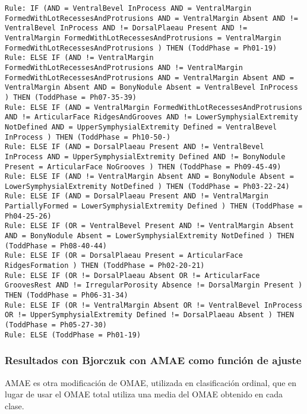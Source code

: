 \begin{lstlisting}
Rule: IF (AND = VentralBevel InProcess AND = VentralMargin FormedWithLotRecessesAndProtrusions AND = VentralMargin Absent AND != VentralBevel InProcess AND != DorsalPlaeau Present AND != VentralMargin FormedWithLotRecessesAndProtrusions = VentralMargin FormedWithLotRecessesAndProtrusions ) THEN (ToddPhase = Ph01-19)
Rule: ELSE IF (AND != VentralMargin FormedWithLotRecessesAndProtrusions AND != VentralMargin FormedWithLotRecessesAndProtrusions AND = VentralMargin Absent AND = VentralMargin Absent AND = BonyNodule Absent = VentralBevel InProcess ) THEN (ToddPhase = Ph07-35-39)
Rule: ELSE IF (AND = VentralMargin FormedWithLotRecessesAndProtrusions AND != ArticularFace RidgesAndGrooves AND != LowerSymphysialExtremity NotDefined AND = UpperSymphysialExtremity Defined = VentralBevel InProcess ) THEN (ToddPhase = Ph10-50-)
Rule: ELSE IF (AND = DorsalPlaeau Present AND != VentralBevel InProcess AND = UpperSymphysialExtremity Defined AND != BonyNodule Present = ArticularFace NoGrooves ) THEN (ToddPhase = Ph09-45-49)
Rule: ELSE IF (AND != VentralMargin Absent AND = BonyNodule Absent = LowerSymphysialExtremity NotDefined ) THEN (ToddPhase = Ph03-22-24)
Rule: ELSE IF (AND = DorsalPlaeau Present AND != VentralMargin PartiallyFormed = LowerSymphysialExtremity Defined ) THEN (ToddPhase = Ph04-25-26)
Rule: ELSE IF (OR = VentralBevel Present AND != VentralMargin Absent AND = BonyNodule Absent = LowerSymphysialExtremity NotDefined ) THEN (ToddPhase = Ph08-40-44)
Rule: ELSE IF (OR = DorsalPlaeau Present = ArticularFace RidgesFormation ) THEN (ToddPhase = Ph02-20-21)
Rule: ELSE IF (OR != DorsalPlaeau Absent OR != ArticularFace GroovesRest AND != IrregularPorosity Absence != DorsalMargin Present ) THEN (ToddPhase = Ph06-31-34)
Rule: ELSE IF (OR != VentralMargin Absent OR != VentralBevel InProcess OR != UpperSymphysialExtremity Defined != DorsalPlaeau Absent ) THEN (ToddPhase = Ph05-27-30)
Rule: ELSE (ToddPhase = Ph01-19)
\end{lstlisting}

\newpage

\subsubsection{Resultados con Bjorczuk con AMAE como función de ajuste}

AMAE \cite{funcionesClasificacionOrdinal} es otra modificación de OMAE, utilizada en clasificación ordinal, que en lugar de usar el OMAE total utiliza una media del OMAE obtenido en cada clase.

